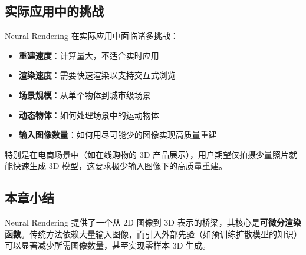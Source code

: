 \subsection{实际应用中的挑战}

Neural Rendering 在实际应用中面临诸多挑战：

\begin{itemize}
    \item \textbf{重建速度}：计算量大，不适合实时应用
    \item \textbf{渲染速度}：需要快速渲染以支持交互式浏览
    \item \textbf{场景规模}：从单个物体到城市级场景
    \item \textbf{动态物体}：如何处理场景中的运动物体
    \item \textbf{输入图像数量}：如何用尽可能少的图像实现高质量重建
\end{itemize}

特别是在电商场景中（如在线购物的 3D 产品展示），用户期望仅拍摄少量照片就能快速生成 3D 模型，这要求极少输入图像下的高质量重建。

\subsection{本章小结}

Neural Rendering 提供了一个从 2D 图像到 3D 表示的桥梁，其核心是\textbf{可微分渲染函数}。传统方法依赖大量输入图像，而引入外部先验（如预训练扩散模型的知识）可以显著减少所需图像数量，甚至实现零样本 3D 生成。

\newpage
